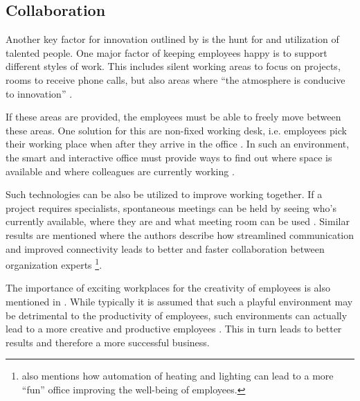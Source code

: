 \subsection{Collaboration}
Another key factor for innovation outlined by \cite{hub13} is the hunt for and utilization of talented people. One major factor of keeping employees happy is to support different styles of work. This includes silent working areas to focus on projects, rooms to receive phone calls, but also areas where ``the atmosphere is conducive to innovation'' \cite{tieto}.

If these areas are provided, the employees must be able to freely move between these areas. One solution for this are non-fixed working desk, i.e. employees pick their working place when after they arrive in the office . In such an environment, the smart and interactive office must provide ways to find out where space is available and where colleagues are currently working \cite{tieto}.

Such technologies can be also be utilized to improve working together. If a project requires specialists, spontaneous meetings can be held by seeing who's currently available, where they are and what meeting room can be used \cite{tieto}. Similar results are mentioned \cite{hbcommunications} where the authors describe how streamlined communication and improved connectivity leads to better and faster collaboration between organization experts \footnote{\cite{hbcommunications} also mentions how automation of heating and lighting can lead to a more ``fun'' office improving the well-being of employees.}.

The importance of exciting workplaces for the creativity of employees is also mentioned in \cite{roomzilla3}. While typically it is assumed that such a playful environment may be detrimental to the productivity of employees, such environments can actually lead to a more creative and productive employees \cite{metroffice}. This in turn leads to better results and therefore a more successful business.



